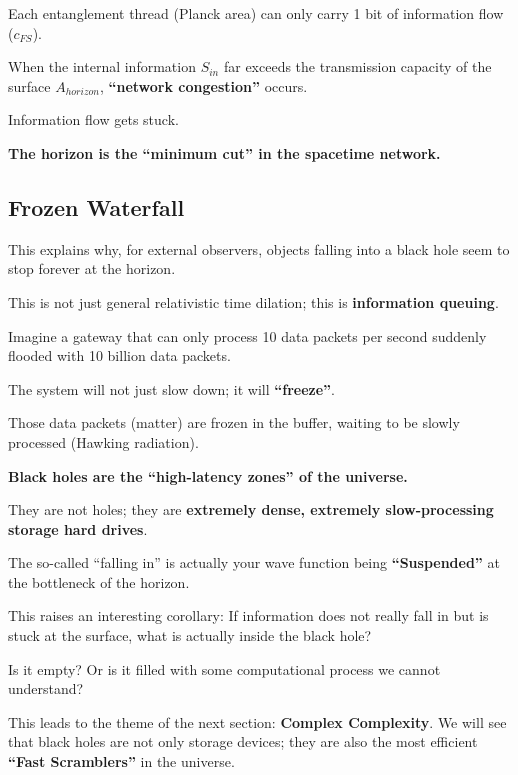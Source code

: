 Each entanglement thread (Planck area) can only carry 1 bit of information flow ($c_{FS}$).

When the internal information $S_{in}$ far exceeds the transmission capacity of the surface $A_{horizon}$, \textbf{``network congestion''} occurs.

Information flow gets stuck.

\textbf{The horizon is the ``minimum cut'' in the spacetime network.}

\subsection{Frozen Waterfall}

This explains why, for external observers, objects falling into a black hole seem to stop forever at the horizon.

This is not just general relativistic time dilation; this is \textbf{information queuing}.

Imagine a gateway that can only process 10 data packets per second suddenly flooded with 10 billion data packets.

The system will not just slow down; it will \textbf{``freeze''}.

Those data packets (matter) are frozen in the buffer, waiting to be slowly processed (Hawking radiation).

\textbf{Black holes are the ``high-latency zones'' of the universe.}

They are not holes; they are \textbf{extremely dense, extremely slow-processing storage hard drives}.

The so-called ``falling in'' is actually your wave function being \textbf{``Suspended''} at the bottleneck of the horizon.

This raises an interesting corollary: If information does not really fall in but is stuck at the surface, what is actually inside the black hole?

Is it empty? Or is it filled with some computational process we cannot understand?

This leads to the theme of the next section: \textbf{Complex Complexity}. We will see that black holes are not only storage devices; they are also the most efficient \textbf{``Fast Scramblers''} in the universe.

